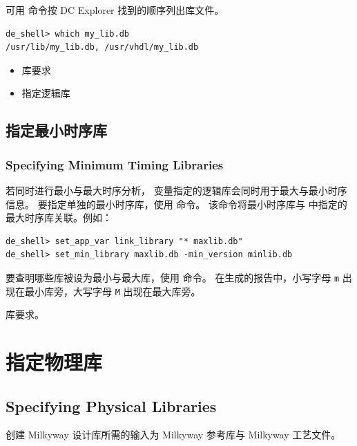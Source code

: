 可用  命令按 DC Explorer 找到的顺序列出库文件。
\begin{lstlisting}
de_shell> which my_lib.db
/usr/lib/my_lib.db, /usr/vhdl/my_lib.db
\end{lstlisting}

\begin{seeAlsoBox}
\begin{itemize}
  \item 库要求
  \item 指定逻辑库
\end{itemize}
\end{seeAlsoBox}

\subsection{指定最小时序库}
\subsubsection*{Specifying Minimum Timing Libraries}

若同时进行最小与最大时序分析， 变量指定的逻辑库会同时用于最大与最小时序信息。
要指定单独的最小时序库，使用  命令。
该命令将最小时序库与  中指定的最大时序库关联。例如：
\begin{lstlisting}
de_shell> set_app_var link_library "* maxlib.db"
de_shell> set_min_library maxlib.db -min_version minlib.db
\end{lstlisting}

要查明哪些库被设为最小与最大库，使用  命令。
在生成的报告中，小写字母 \texttt{m} 出现在最小库旁，大写字母 \texttt{M} 出现在最大库旁。

\begin{seeAlsoBox}
库要求。
\end{seeAlsoBox}

\section{指定物理库}
\subsection*{Specifying Physical Libraries}

创建 Milkyway 设计库所需的输入为 Milkyway 参考库与 Milkyway 工艺文件。

